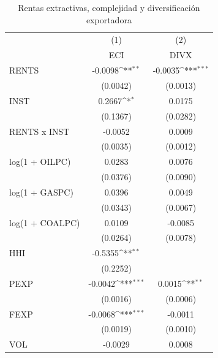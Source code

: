 \begin{table}[htbp]\centering
\def\sym#1{\ifmmode^{#1}\else\(^{#1}\)\fi}
\caption{Rentas extractivas, complejidad y diversificación exportadora}
\begin{tabular}{l*{2}{c}}
\toprule
                    &\multicolumn{1}{c}{(1)}&\multicolumn{1}{c}{(2)}\\
                    &\multicolumn{1}{c}{ECI}&\multicolumn{1}{c}{DIVX}\\
\midrule
RENTS               &     -0.0098\sym{**} &     -0.0035\sym{***}\\
                    &    (0.0042)         &    (0.0013)         \\
\addlinespace
INST                &      0.2667\sym{*}  &      0.0175         \\
                    &    (0.1367)         &    (0.0282)         \\
\addlinespace
RENTS x INST        &     -0.0052         &      0.0009         \\
                    &    (0.0035)         &    (0.0012)         \\
\addlinespace
log(1 + OILPC)      &      0.0283         &      0.0076         \\
                    &    (0.0376)         &    (0.0090)         \\
\addlinespace
log(1 + GASPC)      &      0.0396         &      0.0049         \\
                    &    (0.0343)         &    (0.0067)         \\
\addlinespace
log(1 + COALPC)     &      0.0109         &     -0.0085         \\
                    &    (0.0264)         &    (0.0078)         \\
\addlinespace
HHI                 &     -0.5355\sym{**} &                     \\
                    &    (0.2252)         &                     \\
\addlinespace
PEXP                &     -0.0042\sym{***}&      0.0015\sym{**} \\
                    &    (0.0016)         &    (0.0006)         \\
\addlinespace
FEXP                &     -0.0068\sym{***}&     -0.0011         \\
                    &    (0.0019)         &    (0.0010)         \\
\addlinespace
VOL                 &     -0.0029         &      0.0008         \\

\end{tabular}
\end{table}
